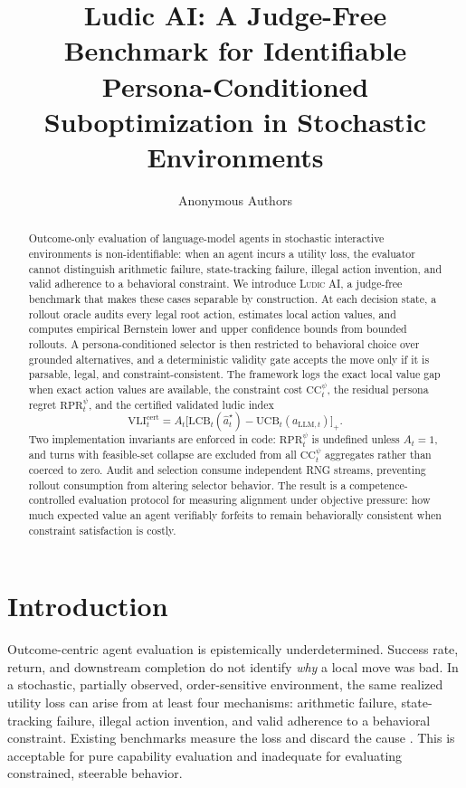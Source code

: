 \documentclass[10pt]{article}
\title{Ludic AI: A Judge-Free Benchmark for Identifiable Persona-Conditioned Suboptimization in Stochastic Environments}
\author{Anonymous Authors}
\date{}
\newcommand{\CC}{\mathrm{CC}}
\newcommand{\RPR}{\mathrm{RPR}}
\newcommand{\VLI}{\mathrm{VLI}}
\newcommand{\LCB}{\mathrm{LCB}}
\newcommand{\UCB}{\mathrm{UCB}}
\newcommand{\ludic}{\textsc{Ludic AI}}
\begin{document}
\maketitle

\begin{abstract}
Outcome-only evaluation of language-model agents in stochastic interactive environments is non-identifiable: when an agent incurs a utility loss, the evaluator cannot distinguish arithmetic failure, state-tracking failure, illegal action invention, and valid adherence to a behavioral constraint. We introduce \ludic, a judge-free benchmark that makes these cases separable by construction. At each decision state, a rollout oracle audits every legal root action, estimates local action values, and computes empirical Bernstein lower and upper confidence bounds from bounded rollouts. A persona-conditioned selector is then restricted to behavioral choice over grounded alternatives, and a deterministic validity gate accepts the move only if it is parsable, legal, and constraint-consistent. The framework logs the exact local value gap when exact action values are available, the constraint cost $\CC_t^\psi$, the residual persona regret $\RPR_t^\psi$, and the certified validated ludic index
$$
\VLI_t^{\mathrm{cert}} = A_t\bigl[\LCB_t(\hat a_t^\star) - \UCB_t(a_{\mathrm{LLM},t})\bigr]_+.
$$
Two implementation invariants are enforced in code: $\RPR_t^\psi$ is undefined unless $A_t=1$, and turns with feasible-set collapse are excluded from all $\CC_t^\psi$ aggregates rather than coerced to zero. Audit and selection consume independent RNG streams, preventing rollout consumption from altering selector behavior. The result is a competence-controlled evaluation protocol for measuring alignment under objective pressure: how much expected value an agent verifiably forfeits to remain behaviorally consistent when constraint satisfaction is costly.
\end{abstract}

\section{Introduction}
Outcome-centric agent evaluation is epistemically underdetermined. Success rate, return, and downstream completion do not identify \emph{why} a local move was bad. In a stochastic, partially observed, order-sensitive environment, the same realized utility loss can arise from at least four mechanisms: arithmetic failure, state-tracking failure, illegal action invention, and valid adherence to a behavioral constraint. Existing benchmarks measure the loss and discard the cause \citep{liu2023agentbench,zhou2023webarena,hafner2021benchmarking,kuttler2020nethack}. This is acceptable for pure capability evaluation and inadequate for evaluating constrained, steerable behavior.
\end{document}
